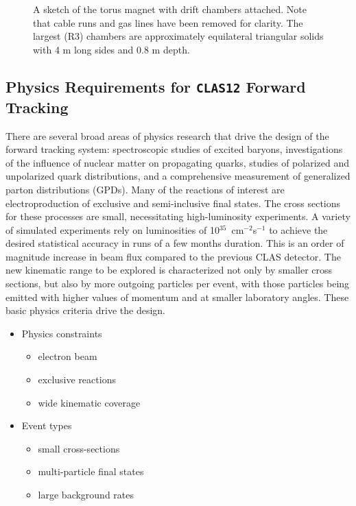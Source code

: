 \begin{figure}[htpb]
\vspace{6.7cm} 
\caption{\small{A sketch of the torus magnet with drift chambers attached.
Note that cable runs and gas lines have been removed for clarity.  The largest
(R3) chambers are approximately equilateral triangular solids with 4 m long sides
and 0.8 m depth.}}
\label{clasview_3d}
\end{figure}



\subsection{Physics Requirements for {\tt CLAS12} Forward Tracking}

There are several broad areas of physics research that drive 
the design of the forward tracking system: 
spectroscopic studies of excited baryons, investigations of 
the influence of nuclear matter on propagating quarks, studies of polarized 
and unpolarized quark distributions, and a comprehensive measurement of 
generalized parton distributions (GPDs).  Many of the reactions of interest 
are electroproduction of exclusive and semi-inclusive final states.  The 
cross sections for these processes are small, necessitating high-luminosity 
experiments.  A variety of simulated experiments rely on luminosities of 
10$^{35}$~cm$^{-2}$s$^{-1}$ to achieve the desired statistical accuracy in 
runs of a few months duration.  This is an order of magnitude increase
in beam flux compared to the previous CLAS detector.  
The new kinematic range to be explored is 
characterized not only by smaller cross sections, but also by more outgoing 
particles per event, with those particles being emitted with higher values 
of momentum and at smaller laboratory angles.  These basic physics criteria 
drive the design. 

\begin{itemize}
\item Physics constraints
\begin{itemize}
\item electron beam
\item exclusive reactions
\item wide kinematic coverage
\end{itemize}
\item Event types
\begin{itemize}
\item small cross-sections
\item multi-particle final states
\item large background rates
\end{itemize}
\end{itemize}


